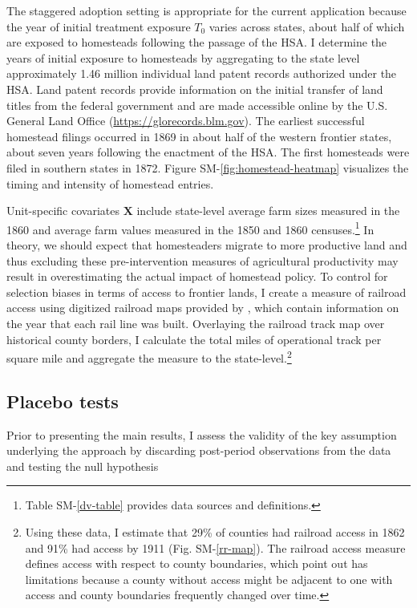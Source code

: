 \documentclass[12pt]{article}
\begin{document}
The staggered adoption setting is appropriate for the current application because the year of initial treatment exposure $T_0$ varies across states, about half of which are exposed to homesteads following the passage of the HSA. I determine the years of initial exposure to homesteads by aggregating to the state level approximately 1.46 million individual land patent records authorized under the HSA. Land patent records provide information on the initial transfer of land titles from the federal government and are made accessible online by the U.S. General Land Office (\url{https://glorecords.blm.gov}). The earliest successful homestead filings occurred in 1869 in about half of the western frontier states, about seven years following the enactment of the HSA. The first homesteads were filed in southern states in 1872. Figure SM-\ref{fig:homestead-heatmap} visualizes the timing and intensity of homestead entries. 

Unit-specific covariates $\mathbf{X}$ include state-level average farm sizes measured in the 1860 and average farm values measured in the 1850 and 1860 censuses.\footnote{Table SM-\ref{dv-table} provides data sources and definitions.} In theory, we should expect that homesteaders migrate to more productive land and thus excluding these pre-intervention measures of agricultural productivity may result in overestimating the actual impact of homestead policy. To control for selection biases in terms of access to frontier lands, I create a measure of railroad access using digitized railroad maps provided by \citet{atack2013use}, which contain information on the year that each rail line was built. Overlaying the railroad track map over historical county borders, I calculate the total miles of operational track per square mile and aggregate the measure to the state-level.\footnote{Using these data, I estimate that 29\% of counties had railroad access in 1862 and 91\% had access by 1911 (Fig. SM-\ref{rr-map}). The railroad access measure defines access with respect to county boundaries, which \citet{atack2012impact} point out has limitations because a county without access might be adjacent to one with access and county boundaries frequently changed over time.}

\subsection{Placebo tests} \label{placebo-tests}

Prior to presenting the main results, I assess the validity of the key assumption underlying the approach by discarding post-period observations from the data and testing the null hypothesis 
\end{document}
